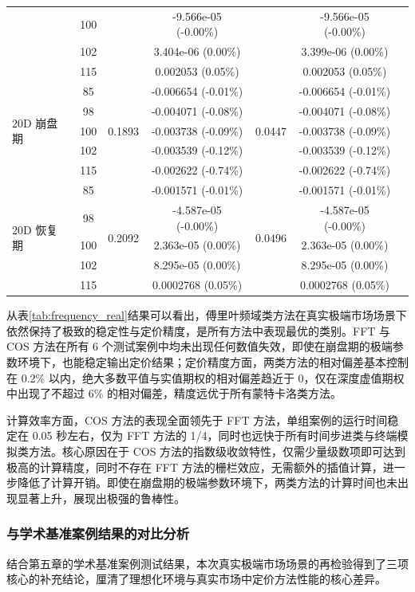 \begin{table}[htbp]
{\begin{tabular}{lclcccc}
    & 100 & & -9.566e-05 (-0.00\%) & & -9.566e-05 (-0.00\%) \\
    & 102 & & 3.404e-06 (0.00\%) & & 3.399e-06 (0.00\%) \\
    & 115 & & 0.002053 (0.05\%) & & 0.002053 (0.05\%) \\
    \midrule
    \multirow{5}{*}{20D 崩盘期} 
    & 85 & \multirow{5}{*}{0.1893} & -0.006654 (-0.01\%) & \multirow{5}{*}{0.0447} & -0.006654 (-0.01\%) \\
    & 98 & & -0.004071 (-0.08\%) & & -0.004071 (-0.08\%) \\
    & 100 & & -0.003738 (-0.09\%) & & -0.003738 (-0.09\%) \\
    & 102 & & -0.003539 (-0.12\%) & & -0.003539 (-0.12\%) \\
    & 115 & & -0.002622 (-0.74\%) & & -0.002622 (-0.74\%) \\
    \midrule
    \multirow{5}{*}{20D 恢复期} 
    & 85 & \multirow{5}{*}{0.2092} & -0.001571 (-0.01\%) & \multirow{5}{*}{0.0496} & -0.001571 (-0.01\%) \\
    & 98 & & -4.587e-05 (-0.00\%) & & -4.587e-05 (-0.00\%) \\
    & 100 & & 2.363e-05 (0.00\%) & & 2.363e-05 (0.00\%) \\
    & 102 & & 8.295e-05 (0.00\%) & & 8.295e-05 (0.00\%) \\
    & 115 & & 0.0002768 (0.05\%) & & 0.0002768 (0.05\%) \\
    \bottomrule
  \end{tabular}%
  }
\end{table}

从表\ref{tab:frequency_real}结果可以看出，傅里叶频域类方法在真实极端市场场景下依然保持了极致的稳定性与定价精度，是所有方法中表现最优的类别。FFT 与 COS 方法在所有 6 个测试案例中均未出现任何数值失效，即使在崩盘期的极端参数环境下，也能稳定输出定价结果；定价精度方面，两类方法的相对偏差基本控制在 0.2\% 以内，绝大多数平值与实值期权的相对偏差趋近于 0，仅在深度虚值期权中出现了不超过 6\% 的相对偏差，精度远优于所有蒙特卡洛类方法。

计算效率方面，COS 方法的表现全面领先于 FFT 方法，单组案例的运行时间稳定在 0.05 秒左右，仅为 FFT 方法的 1/4，同时也远快于所有时间步进类与终端模拟类方法。核心原因在于 COS 方法的指数级收敛特性，仅需少量级数项即可达到极高的计算精度，同时不存在 FFT 方法的栅栏效应，无需额外的插值计算，进一步降低了计算开销。即使在崩盘期的极端参数环境下，两类方法的计算时间也未出现显著上升，展现出极强的鲁棒性。

\subsubsection{与学术基准案例结果的对比分析}
结合第五章的学术基准案例测试结果，本次真实极端市场场景的再检验得到了三项核心的补充结论，厘清了理想化环境与真实市场中定价方法性能的核心差异。

